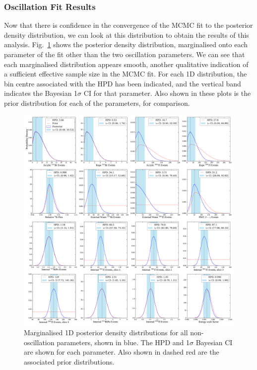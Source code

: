 
\subsubsection{Oscillation Fit Results}
Now that there is confidence in the convergence of the MCMC fit to the posterior density distribution, we can look at this distribution to obtain the results of this analysis. Fig.~\ref{fig:nuisance_params_marged} shows the posterior density distribution, marginalised onto each parameter of the fit other than the two oscillation parameters. We can see that each marginalised distribution appears smooth, another qualitative indication of a sufficient effective sample size in the MCMC fit. For each 1D distribution, the bin centre associated with the HPD has been indicated, and the vertical band indicates the Bayesian 1$\sigma$ CI for that parameter. Also shown in these plots is the prior distribution for each of the parameters, for comparison.

\begin{figure}
    \centering
    \includegraphics[width=\textwidth]{6_SolarAnalysis/images/posterior_densities_plot_no_osc.pdf}
    \caption[Marginalised 1D posterior density distributions for all non-oscillation parameters.]
    {Marginalised 1D posterior density distributions for all non-oscillation parameters, shown in blue. The HPD and 1$\sigma$ Bayesian CI are shown for each parameter. Also shown in dashed red are the associated prior distributions.}
    \label{fig:nuisance_params_marged}
\end{figure}

